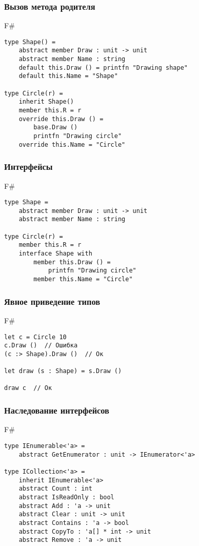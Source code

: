 \documentclass[xetex,mathserif,serif]{beamer}
\begin{document}
   	\begin{frame}[fragile]
   		\frametitle{Вызов метода родителя}
   		\begin{exampleblock}{F\#}
   			\begin{lstlisting}
type Shape() =
    abstract member Draw : unit -> unit
    abstract member Name : string
    default this.Draw () = printfn "Drawing shape"
    default this.Name = "Shape"

type Circle(r) =
    inherit Shape()
    member this.R = r
    override this.Draw () = 
        base.Draw ()
        printfn "Drawing circle"
    override this.Name = "Circle"
\end{lstlisting}
\end{exampleblock}
\end{frame}

   	\begin{frame}[fragile]
   		\frametitle{Интерфейсы}
   		\begin{exampleblock}{F\#}
   			\begin{lstlisting}
type Shape =
    abstract member Draw : unit -> unit
    abstract member Name : string

type Circle(r) =
    member this.R = r
    interface Shape with
        member this.Draw () = 
            printfn "Drawing circle"
        member this.Name = "Circle"
\end{lstlisting}
\end{exampleblock}
\end{frame}

   	\begin{frame}[fragile]
   		\frametitle{Явное приведение типов}
   		\begin{exampleblock}{F\#}
   			\begin{lstlisting}
let c = Circle 10
c.Draw ()  // Ошибка
(c :> Shape).Draw ()  // Ок

let draw (s : Shape) = s.Draw ()

draw c  // Ок
\end{lstlisting}
\end{exampleblock}
\end{frame}

   	\begin{frame}[fragile]
   		\frametitle{Наследование интерфейсов}
   		\begin{exampleblock}{F\#}
   			\begin{lstlisting}
type IEnumerable<'a> =
    abstract GetEnumerator : unit -> IEnumerator<'a>

type ICollection<'a> =
    inherit IEnumerable<'a>
    abstract Count : int
    abstract IsReadOnly : bool
    abstract Add : 'a -> unit
    abstract Clear : unit -> unit
    abstract Contains : 'a -> bool
    abstract CopyTo : 'a[] * int -> unit
    abstract Remove : 'a -> unit
\end{lstlisting}
\end{exampleblock}
\end{frame}
\end{document}
